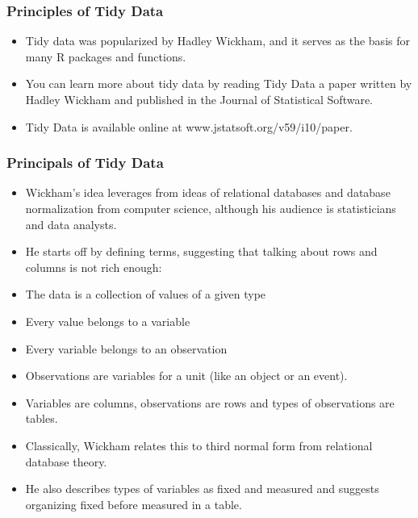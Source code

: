 \documentclass[TIDYMASTER.tex]{subfiles}
\begin{document}
\begin{frame}
	\frametitle{Principles of Tidy Data}
\begin{itemize}
	\item 	Tidy data was popularized by Hadley Wickham, and it serves as the basis for many R packages and functions. 
	\item You can learn more about tidy data by reading Tidy Data a paper written by Hadley Wickham and published in the Journal of Statistical Software. 
	\item Tidy Data is available online at www.jstatsoft.org/v59/i10/paper.
\end{itemize}
\end{frame}
\begin{frame}
\frametitle{Principals of Tidy Data}
\begin{itemize}
\item Wickham’s idea leverages from ideas of relational databases and database normalization from computer science, although his audience is statisticians and data analysts. \item He starts off by defining terms, suggesting that talking about rows and columns is not rich enough:
\end{itemize}

\end{frame}
\begin{frame}

\begin{itemize}
	\item The data is a collection of values of a given type
	\item Every value belongs to a variable
	\item Every variable belongs to an observation
	\item Observations are variables for a unit (like an object or an event).
\end{itemize}
\end{frame}
\begin{frame}

\begin{itemize}
\item Variables are columns, observations are rows and types of observations are tables. 
\item Classically, Wickham relates this to third normal form from relational database theory. 
\item He also describes types of variables as fixed and measured and suggests organizing fixed before measured in a table.
\end{itemize}

\end{frame}
\end{document}
